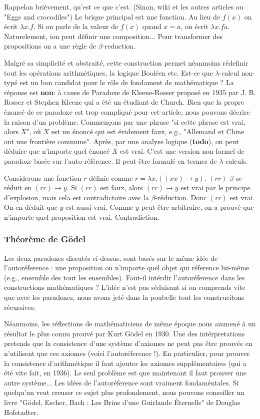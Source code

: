 \documentclass[12pt, a4paper]{article}
\begin{document}
Rappelon brièvement, qu'est ce que c'est. (Sinon, wiki et les autres articles ou "Eggs and crocodiles")
Le brique principal est une fonction. 
Au lieu de $f(x)$ on écrit $\lambda x.f$.
Si on parle de la valeur de $f(x)$ quand $x=a$, on écrit $\lambda x.f a$.
Naturelement, ion peut définir une composition...
Pour transformer des propositions on a une règle de $\beta$-reduction.

Malgré sa simplicité et abstraité, cette construction permet néanmoins rédefinir tout les opérations arithmétiques, la logique Booléen etc.
Est-ce que $\lambda$-calcul non-typé est un bon candidat pour le rôle de fondament de mathématique ?
La réponse est \textbf{non}: à cause de Paradoxe de Kleene-Rosser proposé en 1935 par J. B. Rosser et Stephen Kleene qui a été un étudiant de Church.
Bien que la propre énoncé de ce paradoxe est trop compliqué pour cet article, nous pouvons décrire la raison d'un problème.
Commençons par une phrase "si cette phrase est vrai, alors $X$", où $X$ est un énoncé qui est évidement faux, e.g., "Allemand et Chine ont une frontière commune".
Après, par une analyse logique (\textbf{todo}), on peut déduire que n'importe quel énoncé $X$ est vrai.
C'est une version non-formel de paradoxe basée sur l'auto-référence.
Il peut être formulé en termes de $\lambda$-calculs.

{\footnotesize
	Considerons une fonction $r$ définie comme $r=\lambda x.((x x) \to y)$.
	$(r r)$ $\beta$-se réduit en $(r r) \to y$.
	Si $(r r)$ est faux, alors $(r r) \to y$ est vrai par le principe d'explosion, mais cela est contradictoire avec la $\beta$-réduction.
	Donc $(r r)$ est vrai.
	On en déduit que $y$ est aussi vrai.
	Comme $y$ peut être arbitraire, on a prouvé que n'importe quel proposition est vrai.
	Contradiction.
}

\subsubsection*{Théorème de Gödel}
Les deux paradoxes discutés ci-dessus, sont basés sur le même idée de l'autoréference : une proposition ou n'importe quel objet qui réference lui-même (e.g., ensemble des tout les ensembles).
Faut-il intérdir l'autoréference dans les constructions mathématiques ?
L'idée n'est pas séduisant si on comprends vite que avec les paradoxes, nous avons jeté dans la poubelle tout les construcitons récursives.

Néanmoins, les réflections de mathématiciens de même époque nous ammené à un résultat le plus connu prouvé par Kurt Gödel en 1930. Une des intérpretations pretends que la consistence d'une système d'axiomes ne peut pas être prouvée en n'utilisent que ces axiomes (voici l'autoréference !). En particulier, pour prouver la consistence d'arithmétique il faut ajouter les axiomes supplémentaires (qui a été vite fait, en 1936). Le seul problème est que maintenant il faut prouver une autre système...
{\footnotesize
	Les idées de l'autoréference sont vraiment fondaméntales.
	Si quelqu'un veut creuser ce sujet plus profondement, nous pouvons conseiller un livre "Gödel, Escher, Bach : Les Brins d'une Guirlande Éternelle" de Douglas Hofstadter.
}
\end{document}
